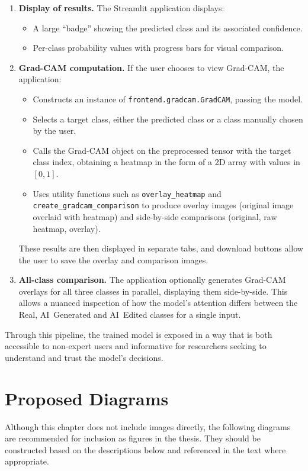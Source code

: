 \begin{enumerate}
  \item \textbf{Display of results.} The Streamlit application displays:
  \begin{itemize}
    \item A large ``badge'' showing the predicted class and its associated confidence.
    \item Per-class probability values with progress bars for visual comparison.
  \end{itemize}
  \item \textbf{Grad-CAM computation.} If the user chooses to view Grad-CAM, the application:
  \begin{itemize}
    \item Constructs an instance of \texttt{frontend.gradcam.GradCAM}, passing the model.
    \item Selects a target class, either the predicted class or a class manually chosen by the user.
    \item Calls the Grad-CAM object on the preprocessed tensor with the target class index, obtaining a heatmap in the form of a 2D array with values in $[0, 1]$.
    \item Uses utility functions such as \texttt{overlay\_heatmap} and \texttt{create\_gradcam\_comparison} to produce overlay images (original image overlaid with heatmap) and side-by-side comparisons (original, raw heatmap, overlay).
  \end{itemize}
  These results are then displayed in separate tabs, and download buttons allow the user to save the overlay and comparison images.
  \item \textbf{All-class comparison.} The application optionally generates Grad-CAM overlays for all three classes in parallel, displaying them side-by-side. This allows a nuanced inspection of how the model's attention differs between the Real, AI~Generated and AI~Edited classes for a single input.
\end{enumerate}

Through this pipeline, the trained model is exposed in a way that is both accessible to non-expert users and informative for researchers seeking to understand and trust the model's decisions.

\section*{Proposed Diagrams}

Although this chapter does not include images directly, the following diagrams are recommended for inclusion as figures in the thesis. They should be constructed based on the descriptions below and referenced in the text where appropriate.

